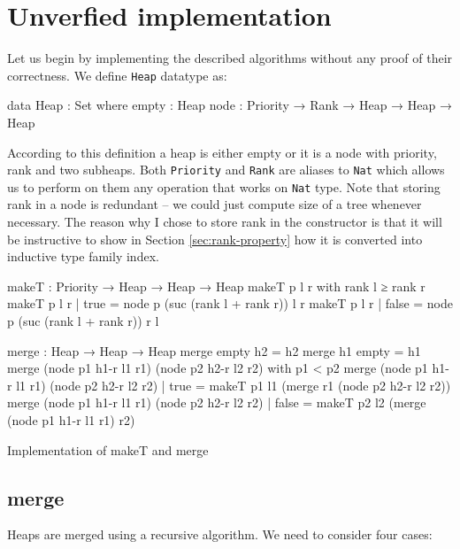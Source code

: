 \section[Unverfied implementation]{Unverfied implementation} \label{sec:no-proofs}
Let us begin by implementing the described algorithms without any proof of their correctness. We define \texttt{Heap} datatype as:

\begin{code}
data Heap : Set where
  empty : Heap
  node  : Priority → Rank → Heap → Heap → Heap
\end{code}
\noindent
According to this definition a heap is either empty or it is a node with priority, rank and two subheaps. Both \texttt{Priority} and \texttt{Rank} are aliases to \texttt{Nat} which allows us to perform on them any operation that works on \texttt{Nat} type. Note that storing rank in a node is redundant -- we could just compute size of a tree whenever necessary. The reason why I chose to store rank in the constructor is that it will be instructive to show in Section \ref{sec:rank-property} how it is converted into inductive type family index.

\begin{listing}[htb!]
\begin{code}
makeT : Priority → Heap → Heap → Heap
makeT p l r with rank l ≥ rank r
makeT p l r | true  = node p (suc (rank l + rank r)) l r
makeT p l r | false = node p (suc (rank l + rank r)) r l

merge : Heap → Heap → Heap
merge empty h2 = h2
merge h1 empty = h1
merge (node p1 h1-r l1 r1) (node p2 h2-r l2 r2)
  with p1 < p2
merge (node p1 h1-r l1 r1) (node p2 h2-r l2 r2)
  | true  = makeT p1 l1 (merge r1 (node p2 h2-r l2 r2))
merge (node p1 h1-r l1 r1) (node p2 h2-r l2 r2)
  | false = makeT p2 l2 (merge (node p1 h1-r l1 r1) r2)
\end{code}
\caption{Implementation of makeT and merge}\label{lst:makeT-merge}
\end{listing}

\subsection{merge}\label{sec:twopass-merge}

Heaps are merged using a recursive algorithm. We need to consider four cases:

